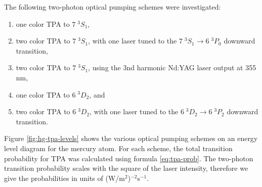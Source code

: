\documentclass[12pt]{mitthesis}
\begin{document}
The following two-photon optical pumping schemes were investigated: 
\renewcommand{\theenumi}{(\alph{enumi})}
\renewcommand{\labelenumi}{\theenumi}
\begin{enumerate}
  \item one color TPA to $7 \; ^3S_1$,
  \item two color TPA to $7 \; ^3S_1$, with one laser tuned to the
    $7 \; ^3S_1 \rightarrow 6 \; ^3P_0$ downward transition,
  \item two color TPA to $7 \; ^3S_1$, using the  3nd harmonic Nd:YAG
    laser output at 355 nm,
  \item one color TPA to $6 \; ^3D_2$, and
  \item two color TPA to $6 \; ^3D_2$, with one laser tuned to the
    $6 \; ^3D_2 \rightarrow 6 \; ^3P_2$ downward transition.
\end{enumerate}
Figure \ref{fig:hg-tpa-levels} shows the various optical pumping
schemes on an energy level diagram for the mercury atom.  For each
scheme, the total transition probability for TPA was calculated using
formula \ref{eq:tpa-prob}.  The two-photon transition probability
scales with the square of the laser intensity, therefore we give the
probabilities in units of (W/m$^2$)$^{-2}$s$^{-1}$.
\end{document}
